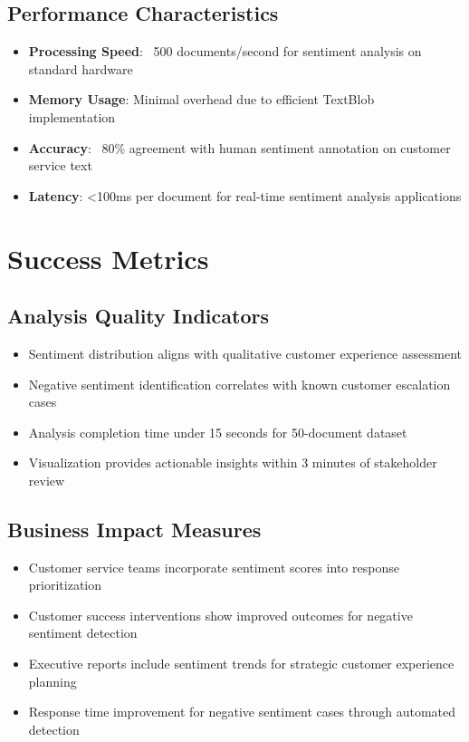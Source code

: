\documentclass[11pt]{article}
\begin{document}
\subsection{Performance Characteristics}
\begin{itemize}
\item \textbf{Processing Speed}: ~500 documents/second for sentiment analysis on standard hardware
\item \textbf{Memory Usage}: Minimal overhead due to efficient TextBlob implementation
\item \textbf{Accuracy}: ~80\% agreement with human sentiment annotation on customer service text
\item \textbf{Latency}: <100ms per document for real-time sentiment analysis applications
\end{itemize}

\section{Success Metrics}

\subsection{Analysis Quality Indicators}
\begin{itemize}
\item Sentiment distribution aligns with qualitative customer experience assessment
\item Negative sentiment identification correlates with known customer escalation cases
\item Analysis completion time under 15 seconds for 50-document dataset
\item Visualization provides actionable insights within 3 minutes of stakeholder review
\end{itemize}

\subsection{Business Impact Measures}
\begin{itemize}
\item Customer service teams incorporate sentiment scores into response prioritization
\item Customer success interventions show improved outcomes for negative sentiment detection
\item Executive reports include sentiment trends for strategic customer experience planning
\item Response time improvement for negative sentiment cases through automated detection
\end{itemize}
\end{document}
